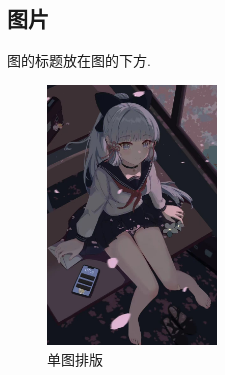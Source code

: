 \documentclass[12pt]{ctexart}
\begin{document}
\subsection{图片}
图的标题放在图的下方.

\begin{figure}[H]	%
	\centering
	\includegraphics[width=0.4\textwidth]{图片1.jpg}
	\caption{单图排版}
	\label{t1}
\end{figure}
\end{document}

